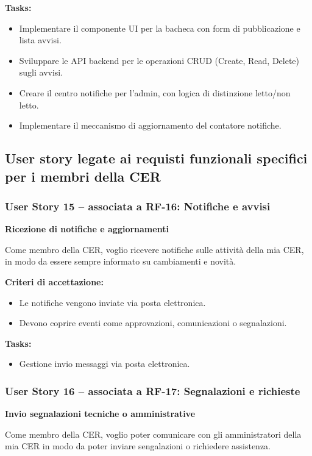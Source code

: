 \textbf{Tasks:}
\begin{itemize}
    \item Implementare il componente UI per la bacheca con form di pubblicazione e lista avvisi.
    \item Sviluppare le API backend per le operazioni CRUD (Create, Read, Delete) sugli avvisi.
    \item Creare il centro notifiche per l'admin, con logica di distinzione letto/non letto.
    \item Implementare il meccanismo di aggiornamento del contatore notifiche.
\end{itemize}



\subsection{User story legate ai requisti funzionali specifici per i membri della CER}

\subsubsection*{User Story 15 – associata a RF-16: Notifiche e avvisi}
\textbf{Ricezione di notifiche e aggiornamenti}

Come membro della CER, voglio ricevere notifiche sulle attività della mia CER, in modo da essere sempre informato su cambiamenti e novità.

\textbf{Criteri di accettazione:}
\begin{itemize}
    \item Le notifiche vengono inviate via posta elettronica.
    \item Devono coprire eventi come approvazioni, comunicazioni o segnalazioni.
\end{itemize}
\textbf{Tasks:}
\begin{itemize}
    \item Gestione invio messaggi via posta elettronica.
\end{itemize}

\subsubsection*{User Story 16 – associata a RF-17: Segnalazioni e richieste}
\textbf{Invio segnalazioni tecniche o amministrative}

Come membro della CER, voglio poter comunicare con gli amministratori della mia CER in modo da poter inviare sengalazioni o richiedere assistenza.

